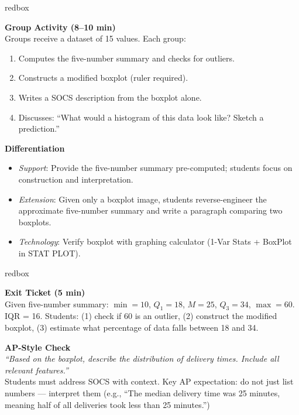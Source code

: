 \documentclass[10pt]{article}
\begin{document}
\begin{skillbox}{redbox}
\begin{minipage}[t]{0.48\linewidth}
    \textbf{Group Activity (8--10 min)}\\
    Groups receive a dataset of 15 values. Each group:
    \begin{enumerate}
        \item Computes the five-number summary and checks for outliers.
        \item Constructs a modified boxplot (ruler required).
        \item Writes a SOCS description from the boxplot alone.
        \item Discusses: ``What would a histogram of this data look like? Sketch a prediction.''
    \end{enumerate}
\end{minipage}
\hfill
\begin{minipage}[t]{0.48\linewidth}
    \textbf{Differentiation}
    \begin{itemize}
        \item \textit{Support}: Provide the five-number summary pre-computed; students focus on construction and interpretation.
        \item \textit{Extension}: Given only a boxplot image, students reverse-engineer the approximate five-number summary and write a paragraph comparing two boxplots.
        \item \textit{Technology}: Verify boxplot with graphing calculator (1-Var Stats + BoxPlot in STAT PLOT).
    \end{itemize}
\end{minipage}
\end{skillbox}

\begin{skillbox}{redbox}
\begin{minipage}[t]{0.48\linewidth}
    \textbf{Exit Ticket (5 min)}\\
    Given five-number summary: $\min=10$, $Q_1=18$, $M=25$, $Q_3=34$, $\max=60$. IQR = 16. Students: (1) check if 60 is an outlier, (2) construct the modified boxplot, (3) estimate what percentage of data falls between 18 and 34.
\end{minipage}
\hfill
\begin{minipage}[t]{0.48\linewidth}
    \textbf{AP-Style Check}\\
    \textit{``Based on the boxplot, describe the distribution of delivery times. Include all relevant features.''}\\[4pt]
    Students must address SOCS with context. Key AP expectation: do not just list numbers --- interpret them (e.g., ``The median delivery time was 25 minutes, meaning half of all deliveries took less than 25 minutes.'')
\end{minipage}
\end{skillbox}
\end{document}
